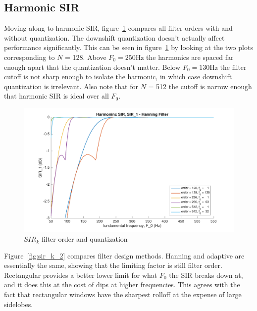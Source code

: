 \documentclass [11pt, proquest,oneside] {ganter_thesis}[2015/03/03]
\begin{document}
\clearpage

\subsection{Harmonic SIR}

Moving along to harmonic SIR, figure~\ref{fig:sir_k_1} compares all filter orders with and without quantization.  The downshift quantization doesn't actually affect performance significantly.  This can be seen in figure~\ref{fig:sir_k_1} by looking at the two plots corresponding to $N$ = 128.  Above $F_0 = 250$Hz the harmonics are spaced far enough apart that the quantization doesn't matter.  Below $F_0 = 130$Hz the filter cutoff is not sharp enough to isolate the harmonic, in which case downshift quantization is irrelevant.  Also note that for $N$ = 512 the cutoff is narrow enough that harmonic SIR is ideal over all $F_0$.

\begin{figure}[!ht]
  \centering
    \includegraphics[width=1\textwidth]{sir_k_1}   
    \caption{$SIR_k$ filter order and quantization}\label{fig:sir_k_1}
\end{figure}

Figure~\ref{fig:sir_k_2} compares filter design methods.  Hanning and adaptive are essentially the same, showing that the limiting factor is still filter order.  Rectangular provides a better lower limit for what $F_0$ the SIR breaks down at, and it does this at the cost of dips at higher frequencies.  This agrees with the fact that rectangular windows have the sharpest rolloff at the expense of large sidelobes.
\end{document}
